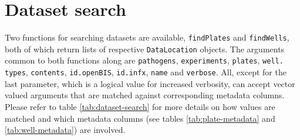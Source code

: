 \section{Dataset search}
\label{sec:dataset-search}
Two functions for searching datasets are available, \texttt{findPlates} and \texttt{findWells}, both of which return lists of respective \texttt{DataLocation} objects. The arguments common to both functions along are \texttt{pathogens}, \texttt{experiments}, \texttt{plates}, \texttt{well. types}, \texttt{contents}, \texttt{id.openBIS}, \texttt{id.infx}, \texttt{name} and \texttt{verbose}. All, except for the last parameter, which is a logical value for increased verbosity, can accept vector valued arguments that are matched against corresponding metadata columns. Please refer to table \ref{tab:dataset-search} for more details on how values are matched and which metadata columns (see tables \ref{tab:plate-metadata} and \ref{tab:well-metadata}) are involved. 

